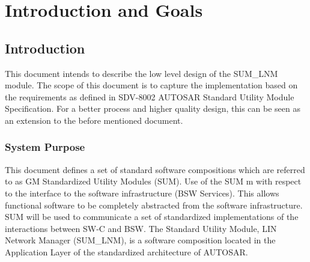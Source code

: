 \chapter{Introduction and Goals}

\section{Introduction}

This document intends to describe the low level design of the SUM_LNM module. The scope of this document is to capture the implementation based on the requirements as defined in 
SDV-8002 AUTOSAR Standard Utility Module Specification. For a better process and higher quality design, this can be seen as an extension to the before mentioned document.

\subsection{System Purpose}

This document defines a set of standard software compositions which are referred to as GM Standardized Utility Modules (SUM). 
Use of the SUM m with respect to the interface to the software infrastructure (BSW Services). This allows functional software to be completely abstracted from 
the software infrastructure. SUM will be used to communicate a set of standardized implementations of the interactions between SW-C and BSW.
The Standard Utility Module, LIN Network Manager (SUM\_LNM), is a software composition located in the Application Layer of the standardized architecture of AUTOSAR.

